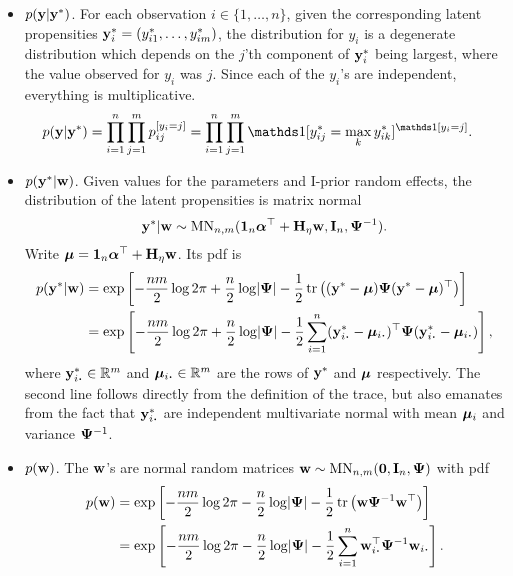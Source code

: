 \begin{itemize}
  \item {\boldmath$p({\mathbf y}|{\mathbf y}^*)$}. For each observation $i\in\{1,\dots,n\}$, given the corresponding latent propensities ${\mathbf y}^*_i = (y_{i1}^*,\dots,y_{im}^*)$, the distribution for $y_i$ is a degenerate distribution which depends on the $j$'th component of ${\mathbf y}^*_i$ being largest, where the value observed for $y_i$ was $j$. Since each of the $y_i$'s are independent, everything is multiplicative.
  \begin{align*}
    p(\by|\by^*) 
    &= \prod_{i=1}^n \prod_{j=1}^m p_{ij}^{[y_i = j]} 
    = \prod_{i=1}^n \prod_{j=1}^m \ind[y_{ij}^* 
    = \max_k y_{ik}^*]^{\ind[y_i = j]}.
  \end{align*}
  
  \item {\boldmath$p({\mathbf y}^*|{\mathbf w})$}. Given values for the parameters and I-prior random effects, the distribution of the latent propensities is matrix normal
  \[
    {\mathbf y}^*|{\mathbf w} \sim \operatorname{MN}_{n,m}({\mathbf 1}_n{\bm\alpha}^\top + {\mathbf H}_\eta{\mathbf w}, {\mathbf I}_n, {\bm\Psi}^{-1}).
  \]
  Write ${\bm\mu} = {\mathbf 1}_n{\bm\alpha}^\top + {\mathbf H}_\eta{\mathbf w}$.
  Its pdf is
  \begin{align*}
    p(\by^*|\bw)
    &= \exp \left[-\half[nm]\log 2\pi + \half[n]\log\abs{\bPsi} - \half\tr \big((\by^* - \bmu) \bPsi (\by^* - \bmu)^\top  \big)  \right] \\
    &= \exp \left[-\half[nm]\log 2\pi + \half[n]\log\abs{\bPsi} - \half\sum_{i=1}^n (\by^*_{i \bigcdot} - \bmu_{i \bigcdot})^\top \bPsi (\by^*_{i \bigcdot} - \bmu_{i \bigcdot})   \right],
  \end{align*}
  where $\by^*_{i \bigcdot} \in\bbR^m$ and $\bmu_{i \bigcdot} \in\bbR^m$ are the rows of ${\mathbf y}^*$ and ${\bm\mu}$ respectively.
  The second line follows directly from the definition of the trace, but also emanates from the fact that $\by_{i \bigcdot}^*$ are independent multivariate normal with mean ${\bm\mu}_i$ and variance ${\bm\Psi}^{-1}$.
  
  \item {\boldmath$p({\mathbf w})$}. The ${\mathbf w}$'s are normal random matrices ${\mathbf w} \sim \operatorname{MN}_{n,m}({\mathbf 0}, {\mathbf I}_n,{\bm\Psi})$ with pdf
  \begin{align*}
    p(\bw) 
    &= \exp \left[-\half[nm]\log 2\pi - \half[n]\log\abs{\bPsi} - \half\tr \big( \bw \bPsi^{-1} \bw^\top \big)  \right] \\
    &= \exp \left[-\half[nm]\log 2\pi - \half[n]\log\abs{\bPsi} - \half\sum_{i=1}^n  \bw_{i \bigcdot}^\top \bPsi^{-1} \bw_{i \bigcdot}   \right].
  \end{align*}
\end{itemize}

